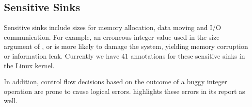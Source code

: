 \subsection{Sensitive Sinks}

Sensitive sinks include sizes for memory allocation, data moving and I/O
communication. For example, an erroneous integer value used in the size
argument of ,  or 
is more likely to damage the system, yielding memory corruption or information
leak. Currently we have 41 annotations for these sensitive sinks in the Linux
kernel.

In addition, control flow decisions based on the outcome of a buggy integer
operation are prone to cause logical errors. \sys highlights these errors
in its report as well.

